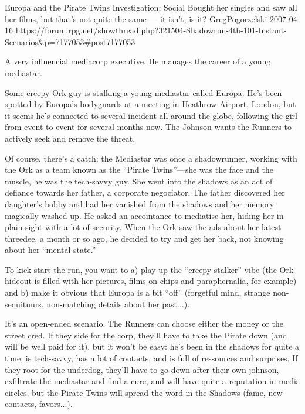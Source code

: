 \begin{scenario}{Europa and the Pirate Twins}
	{Investigation; Social}
	{Bought her singles and saw all her films, but that's not quite the same --- it isn't, is it?}
	{GregPogorzelski}
	{2007-04-16}
	{https://forum.rpg.net/showthread.php?321504-Shadowrun-4th-101-Instant-Scenarios\&p=7177053#post7177053}

A very influencial mediacorp executive. He manages the career of a young mediastar.

\synopsis Some creepy Ork guy is stalking a young mediastar called Europa. He's been spotted by Europa's bodyguards at a meeting in Heathrow Airport, London, but it seems he's connected to several incident all around the globe, following the girl from event to event for several months now. The Johnson wants the Runners to actively seek and remove the threat.

\twist Of course, there's a catch: the Mediastar was once a shadowrunner, working with the Ork as a team known as the ``Pirate Twins''---she was the face and the muscle, he was the tech-savvy guy. She went into the shadows as an act of defiance towards her father, a corporate negociator. The father discovered her daughter's hobby and had her vanished from the shadows and her memory magically washed up. He asked an accointance to mediatise her, hiding her in plain sight with a lot of security. When the Ork saw the ads about her latest threedee, a month or so ago, he decided to try and get her back, not knowing about her ``mental state.''

\notes To kick-start the run, you want to a) play up the ``creepy stalker'' vibe (the Ork hideout is filled with her pictures, films-on-chips and paraphernalia, for example) and b) make it obvious that Europa is a bit ``off'' (forgetful mind, strange non-sequituurs, non-matching details about her past...).

It's an open-ended scenario. The Runners can choose either the money or the street cred. If they side for the corp, they'll have to take the Pirate down (and will be well paid for it), but it won't be easy: he's been in the shadows for quite a time, is tech-savvy, has a lot of contacts, and is full of ressources and surprises. If they root for the underdog, they'll have to go down after their own johnson, exfiltrate the mediastar and find a cure, and will have quite a reputation in media circles, but the Pirate Twins will spread the word in the Shadows (fame, new contacts, favors...). 

\end{scenario}